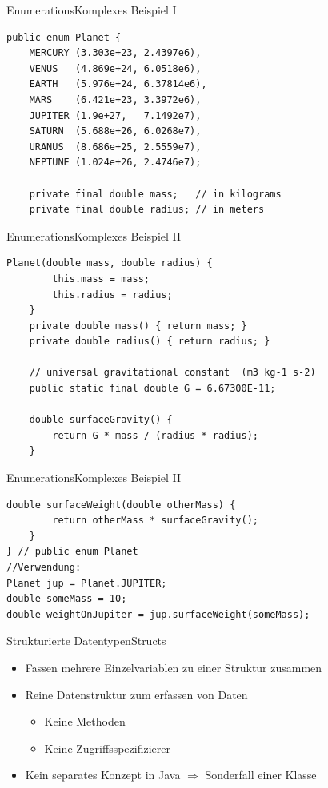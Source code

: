 \begin{frame}[fragile]{Enumerations}{Komplexes Beispiel I}
\lstset{style=java}
\begin{lstlisting}
public enum Planet {
    MERCURY (3.303e+23, 2.4397e6),
    VENUS   (4.869e+24, 6.0518e6),
    EARTH   (5.976e+24, 6.37814e6),
    MARS    (6.421e+23, 3.3972e6),
    JUPITER (1.9e+27,   7.1492e7),
    SATURN  (5.688e+26, 6.0268e7),
    URANUS  (8.686e+25, 2.5559e7),
    NEPTUNE (1.024e+26, 2.4746e7);

    private final double mass;   // in kilograms
    private final double radius; // in meters
\end{lstlisting}
\end{frame}

\begin{frame}[fragile]{Enumerations}{Komplexes Beispiel II}
\lstset{style=java}
\begin{lstlisting}[firstnumber=13]
    Planet(double mass, double radius) {
        this.mass = mass;
        this.radius = radius;
    }
    private double mass() { return mass; }
    private double radius() { return radius; }

    // universal gravitational constant  (m3 kg-1 s-2)
    public static final double G = 6.67300E-11;

    double surfaceGravity() {
        return G * mass / (radius * radius);
    }
\end{lstlisting}
\end{frame}

\begin{frame}[fragile]{Enumerations}{Komplexes Beispiel II}
\lstset{style=java}
\begin{lstlisting}[firstnumber=26]
    double surfaceWeight(double otherMass) {
        return otherMass * surfaceGravity();
    }
} // public enum Planet
//Verwendung:
Planet jup = Planet.JUPITER;
double someMass = 10;
double weightOnJupiter = jup.surfaceWeight(someMass);
\end{lstlisting}
\end{frame}

\begin{frame}{Strukturierte Datentypen}{Structs}
    \begin{itemize}
        \item Fassen mehrere Einzelvariablen zu einer Struktur zusammen
        \item Reine Datenstruktur zum erfassen von Daten
        \begin{itemize}
            \item Keine Methoden
            \item Keine Zugriffsspezifizierer
        \end{itemize}
        \item Kein separates Konzept in Java $\Rightarrow$ Sonderfall einer Klasse
    \end{itemize}
\end{frame}

